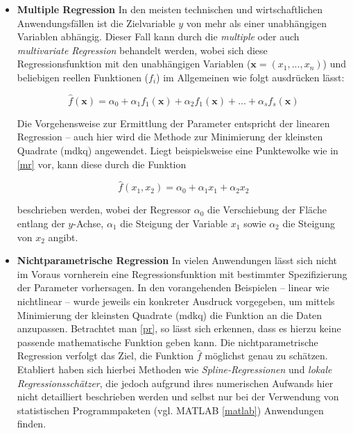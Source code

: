 \begin{itemize}




\item \textbf{Multiple Regression}\enlargethispage{\baselineskip} 
In den meisten technischen und wirtschaftlichen Anwendungsfällen ist die Zielvariable $y$ von mehr als einer unabhängigen Variablen abhängig. Dieser Fall kann durch die \textit{multiple} oder auch \textit{multivariate Regression} behandelt werden, wobei sich diese Regressionsfunktion mit den unabhängigen Variablen ($\boldsymbol{x} = (x_1,...,x_n)$) und beliebigen reellen Funktionen ($f_i$) im Allgemeinen wie folgt ausdrücken lässt:

\begin{equation}
	\hat{f}(\boldsymbol{x}) = \alpha_0 + \alpha_1 f_1(\boldsymbol{x}) + \alpha_2 f_1(\boldsymbol{x}) + ... + \alpha_s f_s(\boldsymbol{x}) 
\end{equation}

Die Vorgehensweise zur Ermittlung der Parameter entspricht der linearen Regression -- auch hier wird die Methode zur Minimierung der kleinsten Quadrate (\gls{mdkq}) angewendet. Liegt beispielsweise eine Punktewolke wie in \vref{mr} vor, kann diese durch die Funktion

\begin{equation}
	\hat{f}(x_1,x_2) = \alpha_0 + \alpha_1 x_1 + \alpha_2 x_2
\end{equation}

beschrieben werden, wobei der Regressor $\alpha_0$ die Verschiebung der Fläche entlang der $y$-Achse, $\alpha_1$ die Steigung der Variable $x_1$ sowie $\alpha_2$ die Steigung von $x_2$ angibt. 




\item \textbf{Nichtparametrische Regression}
In vielen Anwendungen lässt sich nicht im Voraus vornherein eine Regressionsfunktion mit bestimmter Spezifizierung der Parameter vorhersagen. In den vorangehenden Beispielen -- linear wie nichtlinear -- wurde jeweils ein konkreter Ausdruck vorgegeben, um mittels Minimierung der kleinsten Quadrate (\gls{mdkq}) die Funktion an die Daten anzupassen. Betrachtet man \vref{pr}, so lässt sich erkennen, dass es hierzu keine passende mathematische Funktion geben kann. Die nichtparametrische Regression verfolgt das Ziel, die Funktion $\hat{f}$ möglichst genau zu schätzen. Etabliert haben sich hierbei Methoden wie \textit{Spline-Regressionen} und \textit{lokale Regressionsschätzer}, die jedoch aufgrund ihres numerischen Aufwands hier nicht detailliert beschrieben werden und selbst nur bei der Verwendung von statistischen Programmpaketen (vgl. MATLAB \vref{matlab}) Anwendungen finden.


\end{itemize}
